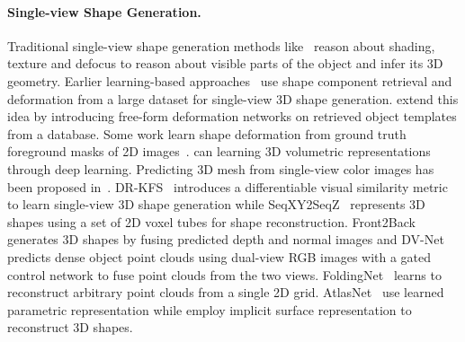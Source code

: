 \paragraph{Single-view Shape Generation.}\vspace{-4mm}
Traditional single-view shape generation methods like~\cite{durou2008numerical,zhang1999shape,favaro2005geometric} reason about shading, texture and defocus to reason about visible parts of the object and infer its 3D geometry.
Earlier learning-based approaches~\cite{huang2015single, su2014estimating} use shape component retrieval and deformation from a large dataset for single-view 3D shape generation.
\cite{kurenkov2018deformnet} extend this idea by introducing free-form deformation networks on retrieved object templates from a database.
Some work learn shape deformation from ground truth foreground masks of 2D images~\cite{kar2015category,yan2016perspective,tulsiani2017multi}.
\cite{3dr2n2,hane2017hierarchical,johnston2017scaling} can learning 3D volumetric representations through deep learning.
Predicting 3D mesh from single-view color images has been proposed in~\cite{wang2018pixel2mesh,pan2019deep,gkioxari2019meshrcnn, tang2019skeleton}.
DR-KFS~\cite{jin2019drkfs} introduces a differentiable visual similarity metric to learn single-view 3D shape generation
while SeqXY2SeqZ~\cite{han2020seqxy2seqz} represents 3D shapes using a set of 2D voxel tubes for shape reconstruction.
Front2Back~\cite{yao2020front2back} generates 3D shapes by fusing predicted depth and normal images and
DV-Net~\cite{jia2020dv} predicts dense object point clouds using dual-view RGB images with a gated control network to fuse point clouds from the two views.
FoldingNet~\cite{yang2018foldingnet} learns to reconstruct arbitrary point clouds from a single 2D grid.
AtlasNet~\cite{groueix2018papier} use learned parametric representation
while \cite{mescheder2019occupancy,park2019deepsdf,liu2019learning,liu2019dist,murez2020atlas} employ implicit surface representation to reconstruct 3D shapes.

